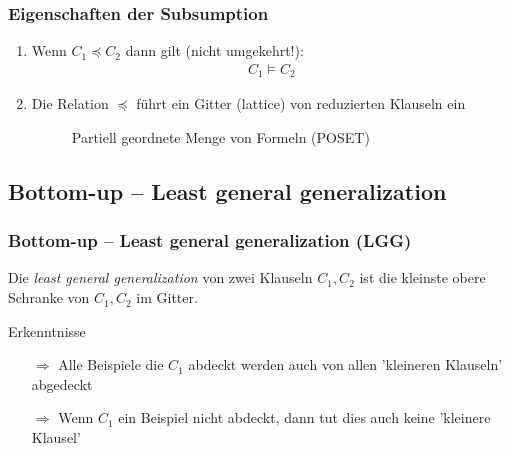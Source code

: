 \begin{frame}
	\frametitle{Eigenschaften der Subsumption}
	\begin{enumerate}
		\item {
			Wenn $C_1 \preceq C_2$ dann gilt (nicht umgekehrt!):
			\begin{align*}
				C_1 \vDash C_2
			\end{align*}
		}
		\item{ Die Relation $\preceq$ führt ein Gitter (lattice) von reduzierten Klauseln ein
			\begin{figure}[H]
				\begin{center}
				\end{center}
				\caption{Partiell geordnete Menge von Formeln (POSET)}
				\label{fig:poset_atomic}
			\end{figure}
		}
	\end{enumerate}
\end{frame}

\subsection{Bottom-up -- Least general generalization}
\begin{frame}
	\frametitle{Bottom-up -- Least general generalization (LGG)}
	 Die \textit{least general generalization} von zwei Klauseln $C_1, C_2$ ist
	 die kleinste obere Schranke von $C_1,C_2$ im Gitter.

	\begin{block}{Erkenntnisse}
			\begin{itemize}
				\item [$\Rightarrow$] Alle Beispiele die $C_1$ abdeckt werden auch von
				allen 'kleineren Klauseln' abgedeckt
				\item[$\Rightarrow$] Wenn $C_1$ ein Beispiel nicht abdeckt,
				dann tut dies auch keine 'kleinere Klausel'
			\end{itemize}
	 \end{block}
\end{frame}

